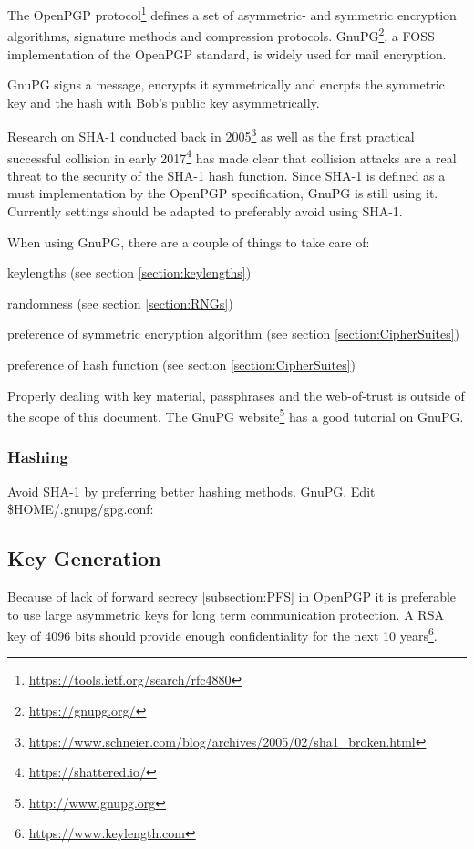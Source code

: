 \gdef\currentsectionname{GPG}
\gdef\currentsubsectionname{GnuPG}

The OpenPGP protocol\footnote{\url{https://tools.ietf.org/search/rfc4880}} defines a set of asymmetric- and symmetric encryption algorithms, signature methods and compression protocols. GnuPG\footnote{\url{https://gnupg.org/}}, a FOSS implementation of the OpenPGP standard, is widely used for mail encryption.
 
GnuPG signs a message, encrypts it symmetrically and encrpts the symmetric key and the hash with Bob's public key asymmetrically.

Research on SHA-1 conducted back in 2005\footnote{\url{https://www.schneier.com/blog/archives/2005/02/sha1\_broken.html}} as well as the first practical successful collision in early 2017\footnote{\url{https://shattered.io/}} has made clear that collision attacks are a real threat to the security of the SHA-1 hash function. Since SHA-1 is defined as a must implementation by the OpenPGP specification, GnuPG is still using it. Currently settings should be adapted to preferably avoid using SHA-1. 

When using GnuPG, there are a couple of things to take care of:
\begin{itemize*}
  \item keylengths (see section \ref{section:keylengths})
  \item randomness (see section \ref{section:RNGs})
  \item preference of symmetric encryption algorithm (see section \ref{section:CipherSuites})
  \item preference of hash function (see section \ref{section:CipherSuites})
\end{itemize*}

Properly dealing with key material, passphrases and the web-of-trust is outside of the scope of this document. The GnuPG
website\footnote{\url{http://www.gnupg.org}} has a good tutorial on GnuPG.

\subsubsection{Hashing}
Avoid SHA-1 by preferring better hashing methods. GnuPG. Edit \$HOME/.gnupg/gpg.conf:


\subsection{Key Generation}
\gdef\currentsectionname{GPG}
\gdef\currentsubsectionname{GnuPG}
Because of lack of forward secrecy \ref{subsection:PFS} in OpenPGP it is preferable to use large asymmetric keys for long term
communication protection. A RSA key of 4096 bits should provide enough confidentiality for the next 10 years\footnote{\url{https://www.keylength.com}}.

